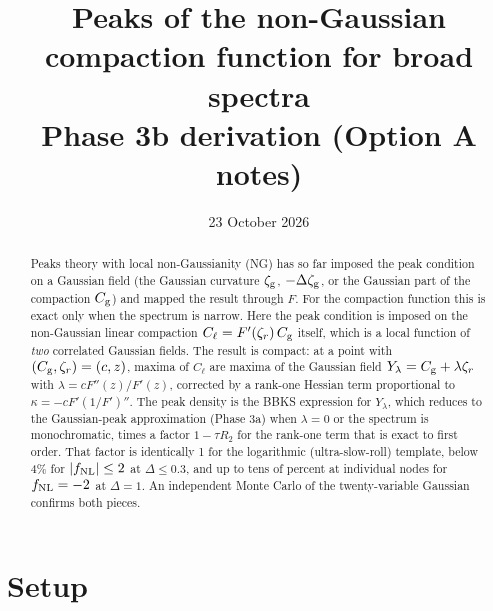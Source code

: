 \documentclass[11pt]{article}
\title{Peaks of the non-Gaussian compaction function for broad spectra\\[2pt]
\large Phase 3b derivation (Option A notes)}
\date{23 October 2026}
\newcommand{\Cg}{C_{\rm g}}
\newcommand{\Cl}{C_{\ell}}
\newcommand{\zr}{\zeta_r}
\newcommand{\zg}{\zeta_{\rm g}}
\begin{document}
\maketitle

\begin{abstract}
Peaks theory with local non-Gaussianity (NG) has so far imposed the peak condition on a Gaussian
field (the Gaussian curvature $\zg$, $-\Delta\zg$, or the Gaussian part of the compaction $\Cg$) and
mapped the result through $F$. For the compaction function this is exact only when the
spectrum is narrow. Here the peak condition is imposed on the non-Gaussian linear compaction
$\Cl=F'(\zr)\,\Cg$ itself, which is a local function of \emph{two} correlated Gaussian fields.
The result is compact: at a point with $(\Cg,\zr)=(c,z)$, maxima of $\Cl$ are maxima of the
Gaussian field $Y_\lambda=\Cg+\lambda\zr$ with $\lambda=cF''(z)/F'(z)$, corrected by a rank-one
Hessian term proportional to $\kappa=-cF'(1/F')''$. The peak density is the BBKS expression for
$Y_\lambda$, which reduces to the Gaussian-peak approximation (Phase 3a) when $\lambda=0$ or the
spectrum is monochromatic, times a factor $1-\tau R_2$ for the rank-one term that is exact to
first order. That factor is identically 1 for the logarithmic (ultra-slow-roll) template, below
4\% for $|f_{\rm NL}|\le2$ at $\Delta\le0.3$, and up to tens of percent at individual nodes for
$f_{\rm NL}=-2$ at $\Delta=1$. An independent Monte Carlo of the twenty-variable Gaussian confirms
both pieces.
\end{abstract}

\section{Setup}
\end{document}
